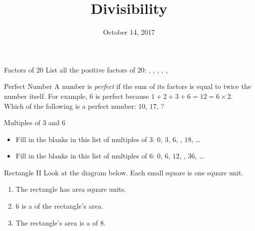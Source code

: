 \documentclass[12pt,letterpaper]{article}
\title{Divisibility}
\date{October 14, 2017}
\begin{document}
\maketitle

\thispagestyle{empty}

\begin{problem}{Factors of \(20\)}
 List all the positive factors of \(20\):
 , ,
 , ,
 , 
\end{problem}

\begin{problem}{Perfect Number}
  A number is \emph{perfect} if the sum of its factors is equal to twice the
  number itself. For example, \(6\) is perfect because \(1+2+3+6=12=6\times2\).
  Which of the following is a perfect number: \(10\), \(17\),
  ?
\end{problem}

\begin{problem}{Multiples of \(3\) and \(6\)}
 \begin{itemize}
  \item Fill in the blanks in this list of multiples of \(3\): \(0\), \(3\),
  \(6\), ,
  \(18\), \ldots

  \item Fill in the blanks in this list of multiples of \(6\): \(0\), \(6\),
  \(12\), ,
  \(36\), \ldots
 \end{itemize}
\end{problem}

\begin{problem}{Rectangle II}
 Look at the diagram below. Each small square is one square unit.

 \begin{center}
 \end{center}

 \begin{enumerate}
  \item The rectangle has area  square units.
  \item \(6\) is a  of the
  rectangle's area.
  \item The rectangle's area is a
   of \(8\).
 \end{enumerate}
\end{problem}
\end{document}
